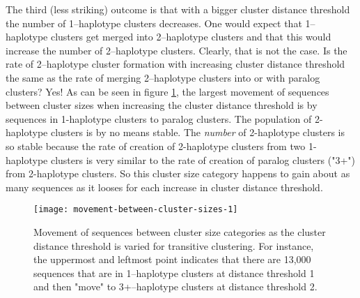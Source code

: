 \documentclass{article}\usepackage[]{graphicx}\usepackage[]{color}
\begin{document}
The third (less striking) outcome is that with a bigger cluster distance threshold the number of 1--haplotype clusters decreases. One would  expect that 1--haplotype clusters get merged into 2--haplotype clusters and that this would increase the number of 2--haplotype clusters. Clearly, that is not the case. Is the rate of 2--haplotype cluster formation with increasing cluster distance threshold the same as the rate of merging 2--haplotype clusters into or with paralog clusters? Yes! As can be seen in figure \ref{Fig:movement-between-cluster-sizes-1}, the largest movement of sequences between cluster sizes when increasing the cluster distance threshold is by sequences in 1-haplotype clusters to paralog clusters. The population of 2-haplotype clusters is by no means stable. The \emph{number} of 2-haplotype clusters is so stable because the rate of creation of 2-haplotype clusters from two 1-haplotype clusters is very similar to the rate of creation of paralog clusters ("3+") from 2-haplotype clusters. So this cluster size category happens to gain about as many sequences as it looses for each increase in cluster distance threshold.

\begin{figure}
\centering
\texttt{[image: movement-between-cluster-sizes-1]}
\caption{Movement of sequences between cluster size categories as the cluster distance threshold is varied for transitive clustering. For instance, the uppermost and leftmost point indicates that there are 13,000 sequences that are in 1--haplotype clusters at distance threshold 1 and then "move" to 3+--haplotype clusters at distance threshold 2.}
\label{Fig:movement-between-cluster-sizes-1}
\end{figure}

\end{document}
